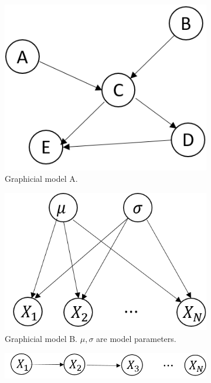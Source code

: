 \begin{refsection}
\begin{figure}[H]
	\centering
	\begin{subfigure}[b]{0.3\textwidth}
		\includegraphics[width=\textwidth]{../figures/statisticalModeling/graphModelExample}
		\caption{Graphicial model A.}
	\end{subfigure}\quad
	\begin{subfigure}[b]{0.3\textwidth}
		\includegraphics[width=\textwidth]{../figures/statisticalModeling/graphModelExample2}
		\caption{Graphicial model B. $\mu,\sigma$ are model parameters.}
	\end{subfigure}\quad
		\begin{subfigure}[b]{0.4\textwidth}
			\includegraphics[width=\textwidth]{../figures/statisticalModeling/graphModelExample3}

\end{subfigure}
\end{figure}
\end{refsection}
